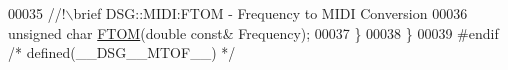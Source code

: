 \begin{DoxyCode}
00035 \textcolor{comment}{        //!\(\backslash\)brief DSG::MIDI:FTOM - Frequency to MIDI Conversion}
00036 \textcolor{comment}{}        \textcolor{keywordtype}{unsigned} \textcolor{keywordtype}{char} \hyperlink{namespace_d_s_g_1_1_m_i_d_i_a79d20f3aac00c6da9b9baed252c04b98}{FTOM}(\textcolor{keywordtype}{double} \textcolor{keyword}{const}& Frequency);
00037     \}
00038 \}
00039 \textcolor{preprocessor}{#endif }\textcolor{comment}{/* defined(\_\_DSG\_\_MTOF\_\_) */}\textcolor{preprocessor}{}
\end{DoxyCode}
